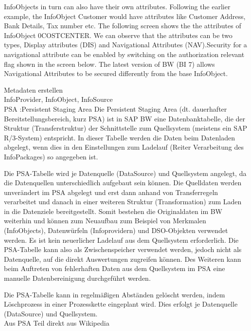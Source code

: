 InfoObjects in turn can also have their own attributes. Following the earlier example, the InfoObject Customer would have attributes like Customer Address, Bank Details, Tax number etc. The following screen shows the the attributes of InfoObject 0COSTCENTER. We can observe that the attributes can be two types, Display attributes (DIS) and Navigational Attributes (NAV).Security for a navigational attribute can be enabled by switching on the authorization relevant flag shown in the screen below. The latest version of BW (BI 7) allows Navigational Attributes to be secured differently from the base InfoObject. %

Metadaten erstellen\\
InfoProvider, InfoObject, InfoSource\\
PSA :Persistent Staging Area
Die Persistent Staging Area (dt. dauerhafter Bereitstellungsbereich, kurz PSA) ist in SAP BW eine Datenbanktabelle, die der Struktur (Transferstruktur) der Schnittstelle zum Quellsystem (meistens ein SAP R/3-System) entspricht. In dieser Tabelle werden die Daten beim Datenladen abgelegt, wenn dies in den Einstellungen zum Ladelauf (Reiter Verarbeitung des InfoPackages) so angegeben ist.

Die PSA-Tabelle wird je Datenquelle (DataSource) und Quellsystem angelegt, da die Datenquellen unterschiedlich aufgebaut sein können. Die Quelldaten werden unverändert im PSA abgelegt und erst dann anhand von Transferregeln verarbeitet und danach in einer weiteren Struktur (Transformation) zum Laden in die Datenziele bereitgestellt. Somit bestehen die Originaldaten im BW weiterhin und können zum Neuaufbau zum Beispiel von Merkmalen (InfoObjects), Datenwürfeln (Infoprovidern) und DSO-Objekten verwendet werden. Es ist kein neuerlicher Ladelauf aus dem Quellsystem erforderlich. Die PSA-Tabelle kann also als Zwischenspeicher verwendet werden, jedoch nicht als Datenquelle, auf die direkt Auswertungen zugreifen können. Des Weiteren kann beim Auftreten von fehlerhaften Daten aus dem Quellsystem im PSA eine manuelle Datenbereinigung durchgeführt werden.

Die PSA-Tabelle kann in regelmäßigen Abständen gelöscht werden, indem Löschprozess in einer Prozesskette eingeplant wird. Dies erfolgt je Datenquelle (DataSource) und Quellsystem. \\ 
Aus PSA Teil direkt aus Wikipedia

